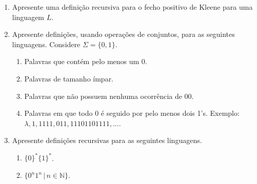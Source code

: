 \documentclass[a4paper]{article}
\theoremstyle{definition}
\begin{document}
  \begin{enumerate}
    \item Apresente uma definição recursiva para o fecho positivo de Kleene para
      uma linguagem $L$.
    \item Apresente definições, usando operações de conjuntos, para as seguintes
      linguagens. Considere $\Sigma = \{0,1\}$.
      \begin{enumerate}
         \item Palavras que contém pelo menos um 0.
         \item Palavras de tamanho ímpar.
         \item Palavras que não possuem nenhuma ocorrência de 00.
         \item Palavras em que todo 0 é seguido por pelo menos dois 1's.
           Exemplo: $\lambda, 1, 1111, 011, 11101101111,...$.
      \end{enumerate}
      \item Apresente definições recursivas para as seguintes linguagens.   
      \begin{enumerate}
         \item $\{0\}^*\{1\}^*$.
         \item $\{0^n1^n\,|\,n\in\mathbb{N}\}$.
      \end{enumerate}
  \end{enumerate}
\end{document}
